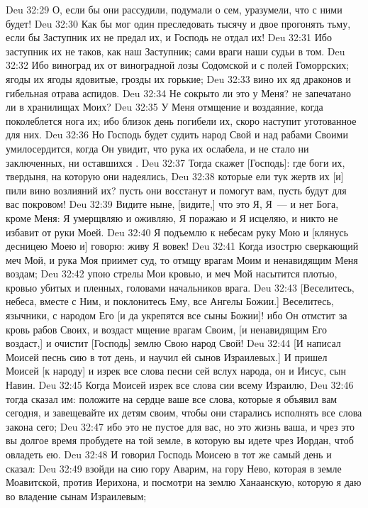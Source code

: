 \vs Deu 32:29 О, если бы они рассудили, подумали о сем, уразумели, что с ними будет!
\vs Deu 32:30 Как бы мог один преследовать тысячу и двое прогонять тьму, если бы Заступник их не предал их, и Господь не отдал их!
\vs Deu 32:31 Ибо заступник их не таков, как наш Заступник; сами враги наши судьи в том.
\vs Deu 32:32 Ибо виноград их от виноградной лозы Содомской и с полей Гоморрских; ягоды их ягоды ядовитые, грозды их горькие;
\vs Deu 32:33 вино их яд драконов и гибельная отрава аспидов.
\vs Deu 32:34 Не сокрыто ли это у Меня? не запечатано ли в хранилищах Моих?
\vs Deu 32:35 У Меня отмщение и воздаяние, когда поколеблется нога их; ибо близок день погибели их, скоро наступит уготованное для них.
\vs Deu 32:36 Но Господь будет судить народ Свой и над рабами Своими умилосердится, когда Он увидит, что рука их ослабела, и не стало ни заключенных, ни оставшихся .
\vs Deu 32:37 Тогда скажет [Господь]: где боги их, твердыня, на которую они надеялись,
\vs Deu 32:38 которые ели тук жертв их [и] пили вино возлияний их? пусть они восстанут и помогут вам, пусть будут для вас покровом!
\vs Deu 32:39 Видите ныне, [видите,] что это Я, Я~--- и нет Бога, кроме Меня: Я умерщвляю и оживляю, Я поражаю и Я исцеляю, и никто не избавит от руки Моей.
\vs Deu 32:40 Я подъемлю к небесам руку Мою и [клянусь десницею Моею и] говорю: живу Я вовек!
\vs Deu 32:41 Когда изострю сверкающий меч Мой, и рука Моя приимет суд, то отмщу врагам Моим и ненавидящим Меня воздам;
\vs Deu 32:42 упою стрелы Мои кровью, и меч Мой насытится плотью, кровью убитых и пленных, головами начальников врага.
\vs Deu 32:43 [Веселитесь, небеса, вместе с Ним, и поклонитесь Ему, все Ангелы Божии.] Веселитесь, язычники, с народом Его [и да укрепятся все сыны Божии]! ибо Он отмстит за кровь рабов Своих, и воздаст мщение врагам Своим, [и ненавидящим Его воздаст,] и очистит [Господь] землю Свою  народ Свой!
\rsbpar\vs Deu 32:44 [И написал Моисей песнь сию в тот день, и научил ей сынов Израилевых.] И пришел Моисей [к народу] и изрек все слова песни сей вслух народа, он и Иисус, сын Навин.
\vs Deu 32:45 Когда Моисей изрек все слова сии всему Израилю,
\vs Deu 32:46 тогда сказал им: положите на сердце ваше все слова, которые я объявил вам сегодня, и завещевайте их детям своим, чтобы они старались исполнять все слова закона сего;
\vs Deu 32:47 ибо это не пустое для вас, но это жизнь ваша, и чрез это вы долгое время пробудете на той земле, в которую вы идете чрез Иордан, чтоб овладеть ею.
\rsbpar\vs Deu 32:48 И говорил Господь Моисею в тот же самый день и сказал:
\vs Deu 32:49 взойди на сию гору Аварим, на гору Нево, которая в земле Моавитской, против Иерихона, и посмотри на землю Ханаанскую, которую я даю во владение сынам Израилевым;
